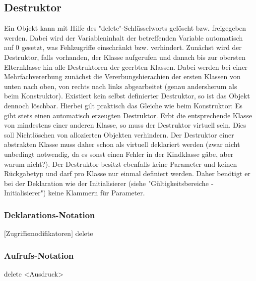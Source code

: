 \subsection{Destruktor}
Ein Objekt kann mit Hilfe des "delete"-Schlüsselworts gelöscht bzw. freigegeben werden.
Dabei wird der Variableninhalt der betreffenden Variable automatisch auf 0 gesetzt, was Fehlzugriffe einschränkt bzw. verhindert.
Zunächst wird der Destruktor, falls vorhanden, der Klasse aufgerufen und danach bis zur obersten Elternklasse hin alle Destruktoren
der geerbten Klassen. Dabei werden bei einer Mehrfachvererbung zunächst die Vererbungshierachien der ersten Klassen von unten nach oben,
von rechts nach links abgearbeitet (genau andersherum als beim Konstruktor).
Existiert kein selbst definierter Destruktor, so ist das Objekt dennoch löschbar. Hierbei gilt praktisch das Gleiche wie beim Konstruktor:
Es gibt stets einen automatisch erzeugten Destruktor.
Erbt die entsprechende Klasse von mindestens einer anderen Klasse, so muss der Destruktor virtuell sein. Dies soll Nichtlöschen von allozierten
Objekten verhindern.
Der Destruktor einer abstrakten Klasse muss daher schon als virtuell deklariert werden (zwar nicht unbedingt notwendig, da es sonst einen Fehler in
der Kindklasse gäbe, aber warum nicht?).
Der Destruktor besitzt ebenfalls keine Parameter und keinen Rückgabetyp und darf pro Klasse nur einmal definiert werden.
Daher benötigt er bei der Deklaration wie der Initialisierer (siehe "Gültigkeitsbereiche - Initialisierer") keine Klammern für Parameter.

\subsubsection{Deklarations-Notation}
[Zugriffsmodifikatoren] delete { }

\subsubsection{Aufrufs-Notation}
delete <Ausdruck>
